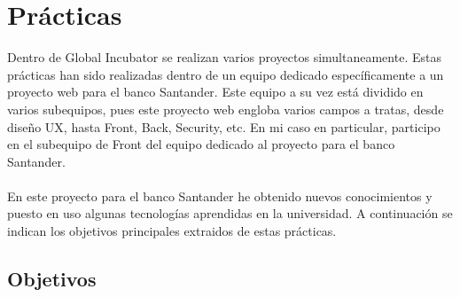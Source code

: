 \documentclass[a4paper,12pt]{article}
\begin{document}
\section{Prácticas}
Dentro de Global Incubator se realizan varios proyectos simultaneamente.
Estas prácticas han sido realizadas dentro de un equipo dedicado específicamente a un proyecto web para el banco Santander. 
Este equipo a su vez está dividido en varios subequipos, pues este proyecto web engloba varios campos a tratas, desde diseño UX, hasta Front, Back, Security, etc.
En mi caso en particular, participo en el subequipo de Front del equipo dedicado al proyecto para el banco Santander.\\
\\ 
En este proyecto para el banco Santander he obtenido nuevos conocimientos y puesto en uso algunas tecnologías aprendidas en la universidad.
A continuación se indican los objetivos principales extraidos de estas prácticas.

\subsection{Objetivos}
\end{document}
